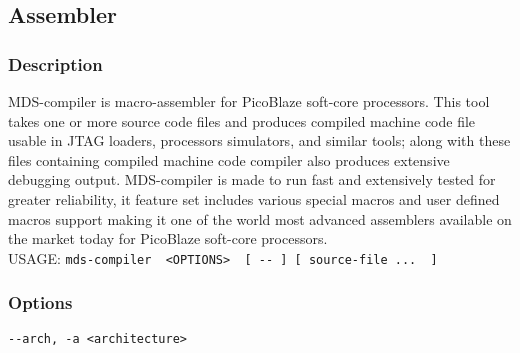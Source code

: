     \subsection{Assembler}
        \subsubsection{Description}
        MDS-compiler is macro-assembler for PicoBlaze soft-core processors. This tool takes one or more source code files and produces compiled machine code file usable in JTAG loaders, processors
        simulators, and similar tools; along with these files containing compiled machine code compiler also produces extensive debugging
        output. MDS-compiler is made to run fast and extensively tested for greater reliability, it feature set includes various special
        macros and user defined macros support making it one of the world most advanced assemblers available on the market today for PicoBlaze
        soft-core processors.\\

        USAGE:
        {
            \usecodefont
            \verb'mds-compiler  <OPTIONS>  [ -- ] [ source-file ...  ]'\\
        }
        \subsubsection{Options}
            {
                \usecodefont
                \verb'--arch, -a <architecture>'\\
            }

